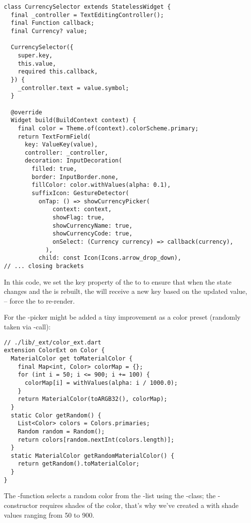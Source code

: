 \begin{lstlisting}
class CurrencySelector extends StatelessWidget {
  final _controller = TextEditingController();
  final Function callback;
  final Currency? value;

  CurrencySelector({
    super.key,
    this.value,
    required this.callback,
  }) {
    _controller.text = value.symbol;
  }

  @override
  Widget build(BuildContext context) {
    final color = Theme.of(context).colorScheme.primary;
    return TextFormField(
      key: ValueKey(value),
      controller: _controller,
      decoration: InputDecoration(
        filled: true,
        border: InputBorder.none,
        fillColor: color.withValues(alpha: 0.1),
        suffixIcon: GestureDetector(
          onTap: () => showCurrencyPicker(
              context: context,
              showFlag: true,
              showCurrencyName: true,
              showCurrencyCode: true,
              onSelect: (Currency currency) => callback(currency),
            ),
          child: const Icon(Icons.arrow_drop_down),
// ... closing brackets
\end{lstlisting}

\noindent In this code, we set the key property of the  to  to ensure that when the 
state changes and the  is rebuilt, the  will receive a new key based on the updated 
value, -- force the  to re-render.

For the -picker might be added a tiny improvement as a color preset (randomly taken via 
-call):

\begin{lstlisting}
// ./lib/_ext/color_ext.dart
extension ColorExt on Color {
  MaterialColor get toMaterialColor {
    final Map<int, Color> colorMap = {};
    for (int i = 50; i <= 900; i += 100) {
      colorMap[i] = withValues(alpha: i / 1000.0);
    }
    return MaterialColor(toARGB32(), colorMap);
  }
  static Color getRandom() {
    List<Color> colors = Colors.primaries;
    Random random = Random();
    return colors[random.nextInt(colors.length)];
  }
  static MaterialColor getRandomMaterialColor() {
    return getRandom().toMaterialColor;
  }
}
\end{lstlisting}

\noindent The -function selects a random color from the -list using the 
-class; the -constructor requires shades of the color, that's why we've created a  
with shade values ranging from 50 to 900.

